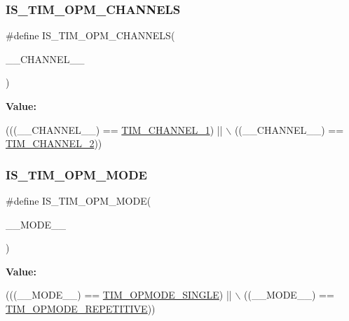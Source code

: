 \subsubsection{\texorpdfstring{I\+S\+\_\+\+T\+I\+M\+\_\+\+O\+P\+M\+\_\+\+C\+H\+A\+N\+N\+E\+LS}{IS\_TIM\_OPM\_CHANNELS}}
{\footnotesize\ttfamily \#define I\+S\+\_\+\+T\+I\+M\+\_\+\+O\+P\+M\+\_\+\+C\+H\+A\+N\+N\+E\+LS(\begin{DoxyParamCaption}\item[{}]{\+\_\+\+\_\+\+C\+H\+A\+N\+N\+E\+L\+\_\+\+\_\+ }\end{DoxyParamCaption})}

{\bfseries Value\+:}
\begin{DoxyCode}
(((\_\_CHANNEL\_\_) == \hyperlink{group___t_i_m___channel_ga6b1541e4a49d62610899e24bf23f4879}{TIM\_CHANNEL\_1}) || \(\backslash\)
                                            ((\_\_CHANNEL\_\_) == \hyperlink{group___t_i_m___channel_ga33e02d43345a7ac5886f01b39e4f7ccd}{TIM\_CHANNEL\_2}))
\end{DoxyCode}
\mbox{\label{group___t_i_m___private___macros_ga38ab7126db5202ad9a465838160a805c}} 
\subsubsection{\texorpdfstring{I\+S\+\_\+\+T\+I\+M\+\_\+\+O\+P\+M\+\_\+\+M\+O\+DE}{IS\_TIM\_OPM\_MODE}}
{\footnotesize\ttfamily \#define I\+S\+\_\+\+T\+I\+M\+\_\+\+O\+P\+M\+\_\+\+M\+O\+DE(\begin{DoxyParamCaption}\item[{}]{\+\_\+\+\_\+\+M\+O\+D\+E\+\_\+\+\_\+ }\end{DoxyParamCaption})}

{\bfseries Value\+:}
\begin{DoxyCode}
(((\_\_MODE\_\_) == \hyperlink{group___t_i_m___one___pulse___mode_gab0447b341024e86145c7ce0dc2931fc6}{TIM\_OPMODE\_SINGLE}) || \(\backslash\)
                                            ((\_\_MODE\_\_) == \hyperlink{group___t_i_m___one___pulse___mode_ga14a7b6f95769c5b430f65189d9c7cfa3}{TIM\_OPMODE\_REPETITIVE}))
\end{DoxyCode}
\mbox{\label{group___t_i_m___private___macros_gaf5097557634d53d3f9438cf222e2192b}} 
